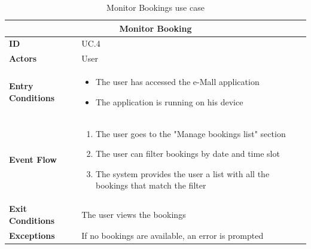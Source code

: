 \documentclass[12pt]{report}
\begin{document}
    \newpage
    \begin{table}[h]
        \centering
        \begin{tabular}{ |p{4cm}|p{11cm}|  }
        \hline
        \multicolumn{2}{|c|}{\textbf{Monitor Booking}} \\
        \hline
            \textbf{ID} &  UC.4\\
        \hline
            \textbf{Actors} & User\\
        \hline
            \textbf{Entry Conditions} &
                \begin{itemize}
                    \item The user has accessed the e-Mall application
                    \item The application is running on his device
                \end{itemize}\\
        \hline
            \textbf{Event Flow} &
                \begin{enumerate}
                    \item The user goes to the "Manage bookings list" section
                    \item The user can filter bookings by date and time slot
                    \item The system provides the user a list with all the bookings that match the filter
                \end{enumerate}\\
        \hline
            \textbf{Exit Conditions} & The user views the bookings\\
        \hline
            \textbf{Exceptions} & If no bookings are available, an error is prompted\\
        \hline
        \end{tabular}
        \caption{\label{demo-table}Monitor Bookings use case}
    \end{table}
    \clearpage
\end{document}
